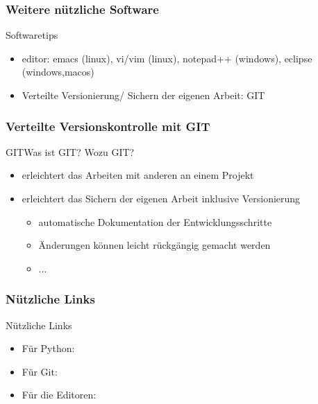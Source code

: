 \documentclass{beamer}
\begin{document}
\subsubsection{Weitere n\" utzliche Software}
\begin{frame}{Softwaretips}

  \begin{itemize}
  \item
    editor: emacs (linux), vi/vim (linux), notepad++ (windows), eclipse (windows,macos)
  \item
    Verteilte Versionierung/ Sichern der eigenen Arbeit: GIT
  \end{itemize}
\end{frame}

\subsubsection{Verteilte Versionskontrolle mit GIT}

\begin{frame}{GIT}{Was ist GIT? Wozu GIT?}

  \begin{itemize}
  \item
    erleichtert das Arbeiten mit anderen an einem Projekt
  \item
    erleichtert das Sichern der eigenen Arbeit inklusive Versionierung
  \begin{itemize}
   \item automatische Dokumentation der Entwicklungsschritte
   \item \"Anderungen k\" onnen leicht r\"uckg\"angig gemacht werden
   \item ...
  \end{itemize}
  \end{itemize}
\end{frame}

\subsubsection{N\"utzliche Links}

\begin{frame}{N\"utzliche Links}{}

  \begin{itemize}
  \item
    F\"ur Python:
  \item
    F\"ur Git:
  \item
    F\"ur die Editoren:
  \end{itemize}
\end{frame}
\end{document}
